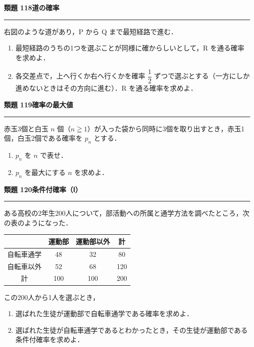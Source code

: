 \documentclass[a4paper,11pt]{ltjsarticle}
\newcommand{\mon}[2]{\Needspace{7\baselineskip}\vspace{10pt}%
  {\sffamily\bfseries 類題 #1\quad #2\par}\vspace{2pt}\hrule\vspace{4pt}}
\begin{document}
\mon{118}{道の確率}
\begin{minipage}[t]{0.62\linewidth}
右図のような道があり，P から Q まで最短経路で進む．
\begin{enumerate}
\item 最短経路のうちの1つを選ぶことが同様に確からしいとして，R を通る確率を求めよ．
\item 各交差点で，上へ行くか右へ行くかを確率 $\dfrac12$ ずつで選ぶとする（一方にしか進めないときはその方向に進む）．R を通る確率を求めよ．
\end{enumerate}
\end{minipage}\hfill
\begin{minipage}[t]{0.34\linewidth}
\vspace{-4pt}
\end{minipage}

\mon{119}{確率の最大値}
赤玉3個と白玉 $n$ 個（$n\geqq1$）が入った袋から同時に3個を取り出すとき，赤玉1個，白玉2個である確率を $p_n$ とする．
\begin{enumerate}
\item $p_n$ を $n$ で表せ．
\item $p_n$ を最大にする $n$ を求めよ．
\end{enumerate}

\mon{120}{条件付確率（Ⅰ）}
ある高校の2年生200人について，部活動への所属と通学方法を調べたところ，次の表のようになった．
\begin{center}
\renewcommand{\arraystretch}{1.2}
\begin{tabular}{c|cc|c}
 & 運動部 & 運動部以外 & 計\\ \hline
自転車通学 & 48 & 32 & 80\\
自転車以外 & 52 & 68 & 120\\ \hline
計 & 100 & 100 & 200
\end{tabular}
\end{center}
この200人から1人を選ぶとき，
\begin{enumerate}
\item 選ばれた生徒が運動部で自転車通学である確率を求めよ．
\item 選ばれた生徒が自転車通学であるとわかったとき，その生徒が運動部である条件付確率を求めよ．
\end{enumerate}
\end{document}
